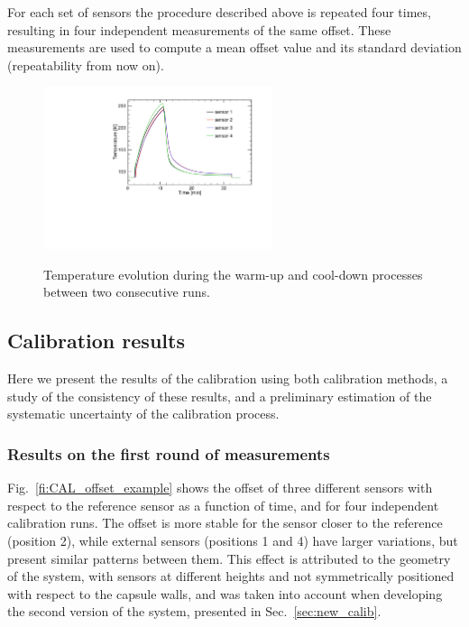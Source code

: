 For each set of sensors the procedure described above is repeated four times, resulting in four independent measurements of the same offset. These measurements are used to compute a mean offset value and its standard deviation (repeatability from now on).  

\begin{figure}[htbp]
\centering
{\includegraphics[width=0.6\textwidth]{images/figure_8.pdf}}
\caption{Temperature evolution during the warm-up and cool-down processes between two consecutive runs. }
\label{fi:CAL_pre}
\end{figure}


\subsection{Calibration results}
\label{sec:calib_results}
\noindent Here we present the results of the calibration using both calibration methods, a study of the consistency of these results, and a preliminary estimation of the systematic uncertainty of the calibration process.

\subsubsection{Results on the first round of measurements}
\noindent Fig.~\ref{fi:CAL_offset_example} shows the offset of three different sensors with respect to the reference sensor as a function of time, and for four independent calibration runs. The offset is more stable for the sensor closer to the reference (position 2), while external sensors (positions 1 and 4) have larger variations, but present similar patterns between them. This effect is attributed to the geometry of the system, with sensors at different heights and not symmetrically positioned with respect to the capsule walls, and was taken into account when developing the second version of the system, presented in Sec.~\ref{sec:new_calib}. 

